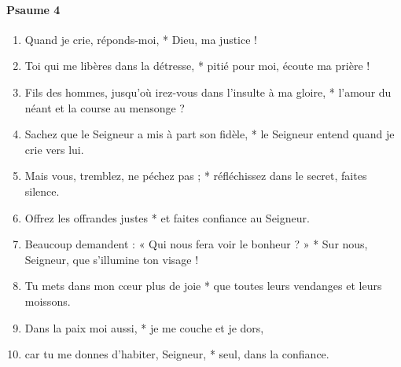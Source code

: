 \documentclass[twoside]{article}
\begin{document}
\begin{paracol}[1]{2}
\paragraph{Psaume 4}
\begin{enumerate}[wide, itemsep=0mm, labelwidth=!, labelindent=0pt, label=\color{gregoriocolor}\theenumi]
\item Quand je crie, réponds-moi, *
Dieu, ma justice !
\item Toi qui me libères dans la détresse, *
pitié pour moi, écoute ma prière !
\item Fils des hommes,
jusqu'où irez-vous dans l'insulte à ma gloire, *
l'amour du néant et la course au mensonge ?
\item Sachez que le Seigneur a mis à part son fidèle, *
le Seigneur entend quand je crie vers lui.
\item Mais vous, tremblez, ne péchez pas ; *
réfléchissez dans le secret, faites silence.
\item Offrez les offrandes justes *
et faites confiance au Seigneur.
\item Beaucoup demandent :
« Qui nous fera voir le bonheur ? » *
Sur nous, Seigneur, que s'illumine ton visage !
\item Tu mets dans mon cœur plus de joie *
que toutes leurs vendanges et leurs moissons.
\item Dans la paix moi aussi, *
je me couche et je dors,
\item car tu me donnes d'habiter, Seigneur, *
seul, dans la confiance.
\end{enumerate}
\switchcolumn*


\end{paracol}
\end{document}
